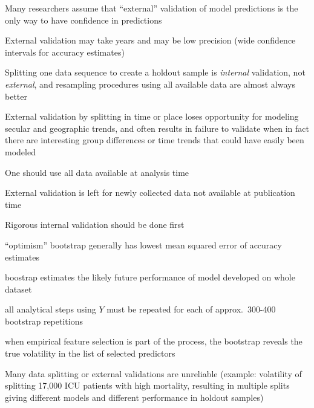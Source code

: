 \bi
\item Many researchers assume that ``external'' validation of model
  predictions is the only way to have confidence in predictions
\item External validation may take years and may be low precision
  (wide confidence intervals for accuracy estimates)
\item Splitting one data sequence to create a holdout sample is
  \emph{internal} validation, not \emph{external}, and resampling
  procedures using all available data are almost always better
\item External validation by splitting in time or place loses
  opportunity for modeling secular and geographic trends, and often
  results in failure to validate when in fact there are interesting
  group differences or time trends that could have easily been modeled
\item One should use all data available at analysis time\ipacue
\item External validation is left for newly collected data not
  available at publication time
\item Rigorous internal validation should be done first
  \bi
  \item ``optimism'' bootstrap generally has lowest mean squared error
    of accuracy estimates
  \item boostrap estimates the likely future performance of model
    developed on whole dataset
  \item all analytical steps using $Y$ must be repeated for each of
    approx.\ 300-400 bootstrap repetitions
  \item when empirical feature selection is part of the process, the bootstrap
    reveals the true volatility in the list of selected predictors
  \ei
\item Many data splitting or external validations are unreliable \ipacue
  (example: volatility of splitting 17,000 ICU patients with high
  mortality, resulting in multiple splits giving different models and
  different performance in holdout samples)
\ei

